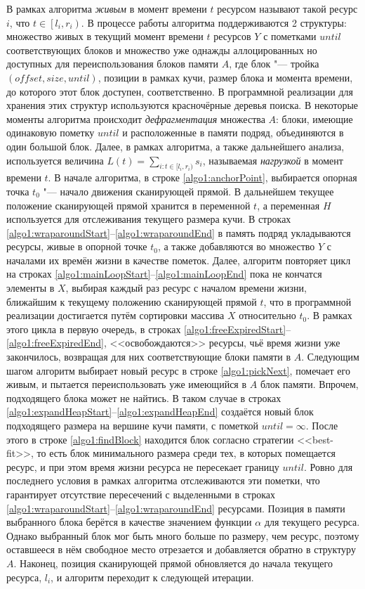 В рамках алгоритма \textit{живым} в момент времени $t$ ресурсом называют такой ресурс $i$, что $t \in \left[l_i, r_i\right)$.
В процессе работы алгоритма поддерживаются 2 структуры: множество живых в текущий момент времени $t$ ресурсов $Y$ с пометками $until$ соответствующих блоков и множество уже однажды аллоцированных но доступных для переиспользования блоков памяти $A$, где блок "--- тройка $(offset, size, until)$, позиции в рамках кучи, размер блока и момента времени, до которого этот блок доступен, соответственно.
В программной реализации для хранения этих структур используются красночёрные деревья поиска.
В некоторые моменты алгоритма происходит \textit{дефрагментация} множества $A$: блоки, имеющие одинаковую пометку $until$ и расположенные в памяти подряд, объединяются в один большой блок.
Далее, в рамках алгоритма, а также дальнейшего анализа, используется величина $L(t) = \sum_{i: t \in [l_i, r_i)} s_i$, называемая \textit{нагрузкой} в момент времени $t$.
В начале алгоритма, в строке \ref{algo1:anchorPoint}, выбирается опорная точка $t_0$ "--- начало движения сканирующей прямой.
В дальнейшем текущее положение сканирующей прямой хранится в переменной $t$, а переменная $H$ используется для отслеживания текущего размера кучи.
В строках \ref{algo1:wraparoundStart}--\ref{algo1:wraparoundEnd} в память подряд укладываются ресурсы, живые в опорной точке $t_0$, а также добавляются во множество $Y$ с началами их времён жизни в качестве пометок.
Далее, алгоритм повторяет цикл на строках \ref{algo1:mainLoopStart}--\ref{algo1:mainLoopEnd} пока не кончатся элементы в $X$, выбирая каждый раз ресурс с началом времени жизни, ближайшим к текущему положению сканирующей прямой $t$, что в программной реализации достигается путём сортировки массива $X$ относительно $t_0$.
В рамках этого цикла в первую очередь, в строках \ref{algo1:freeExpiredStart}--\ref{algo1:freeExpiredEnd}, <<освобождаются>> ресурсы, чьё время жизни уже закончилось, возвращая для них соответствующие блоки памяти в $A$.
Следующим шагом алгоритм выбирает новый ресурс в строке \ref{algo1:pickNext}, помечает его живым, и пытается переиспользовать уже имеющийся в $A$ блок памяти.
Впрочем, подходящего блока может не найтись.
В таком случае в строках \ref{algo1:expandHeapStart}--\ref{algo1:expandHeapEnd} создаётся новый блок подходящего размера на вершине кучи памяти, с пометкой $until = \infty$.
После этого в строке \ref{algo1:findBlock} находится блок согласно стратегии <<best-fit>>, то есть блок минимального размера среди тех, в которых помещается ресурс, и при этом время жизни ресурса не пересекает границу $until$.
Ровно для последнего условия в рамках алгоритма отслеживаются эти пометки, что гарантирует отсутствие пересечений с выделенными в строках \ref{algo1:wraparoundStart}--\ref{algo1:wraparoundEnd} ресурсами.
Позиция в памяти выбранного блока берётся в качестве значением функции $\alpha$ для текущего ресурса.
Однако выбранный блок мог быть много больше по размеру, чем ресурс, поэтому оставшееся в нём свободное место отрезается и добавляется обратно в структуру $A$.
Наконец, позиция сканирующей прямой обновляется до начала текущего ресурса, $l_i$, и алгоритм переходит к следующей итерации.

